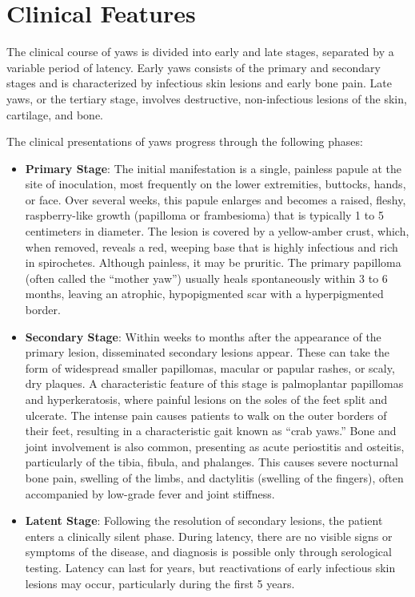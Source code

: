 \section*{Clinical Features}
The clinical course of yaws is divided into early and late stages, separated by a variable period of latency. Early yaws consists of the primary and secondary stages and is characterized by infectious skin lesions and early bone pain. Late yaws, or the tertiary stage, involves destructive, non-infectious lesions of the skin, cartilage, and bone.

The clinical presentations of yaws progress through the following phases:
\begin{itemize}
    \item \textbf{Primary Stage}: The initial manifestation is a single, painless papule at the site of inoculation, most frequently on the lower extremities, buttocks, hands, or face. Over several weeks, this papule enlarges and becomes a raised, fleshy, raspberry-like growth (papilloma or frambesioma) that is typically 1 to 5 centimeters in diameter. The lesion is covered by a yellow-amber crust, which, when removed, reveals a red, weeping base that is highly infectious and rich in spirochetes. Although painless, it may be pruritic. The primary papilloma (often called the ``mother yaw'') usually heals spontaneously within 3 to 6 months, leaving an atrophic, hypopigmented scar with a hyperpigmented border.
    \item \textbf{Secondary Stage}: Within weeks to months after the appearance of the primary lesion, disseminated secondary lesions appear. These can take the form of widespread smaller papillomas, macular or papular rashes, or scaly, dry plaques. A characteristic feature of this stage is palmoplantar papillomas and hyperkeratosis, where painful lesions on the soles of the feet split and ulcerate. The intense pain causes patients to walk on the outer borders of their feet, resulting in a characteristic gait known as ``crab yaws.'' Bone and joint involvement is also common, presenting as acute periostitis and osteitis, particularly of the tibia, fibula, and phalanges. This causes severe nocturnal bone pain, swelling of the limbs, and dactylitis (swelling of the fingers), often accompanied by low-grade fever and joint stiffness.
    \item \textbf{Latent Stage}: Following the resolution of secondary lesions, the patient enters a clinically silent phase. During latency, there are no visible signs or symptoms of the disease, and diagnosis is possible only through serological testing. Latency can last for years, but reactivations of early infectious skin lesions may occur, particularly during the first 5 years.

\end{itemize}
